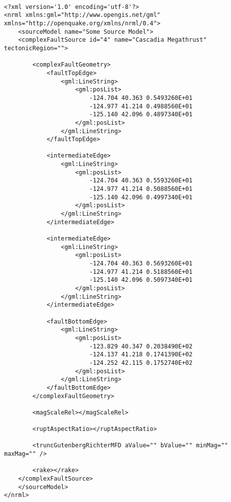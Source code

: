 \begin{Verbatim}[frame=single, commandchars=\\\{\}, fontsize=\scriptsize, samepage=true]

<?xml version='1.0' encoding='utf-8'?>
<nrml xmlns:gml="http://www.opengis.net/gml" xmlns="http://openquake.org/xmlns/nrml/0.4">
    <sourceModel name="Some Source Model">
    <complexFaultSource id="4" name="Cascadia Megathrust" tectonicRegion="">

        <complexFaultGeometry>
            <faultTopEdge>
                <gml:LineString>
                    <gml:posList>
                        -124.704 40.363 0.5493260E+01
                        -124.977 41.214 0.4988560E+01
                        -125.140 42.096 0.4897340E+01
                    </gml:posList>
                </gml:LineString>
            </faultTopEdge>

            <intermediateEdge>
                <gml:LineString>
                    <gml:posList>
                        -124.704 40.363 0.5593260E+01
                        -124.977 41.214 0.5088560E+01
                        -125.140 42.096 0.4997340E+01
                    </gml:posList>
                </gml:LineString>
            </intermediateEdge>

            <intermediateEdge>
                <gml:LineString>
                    <gml:posList>
                        -124.704 40.363 0.5693260E+01
                        -124.977 41.214 0.5188560E+01
                        -125.140 42.096 0.5097340E+01
                    </gml:posList>
                </gml:LineString>
            </intermediateEdge>

            <faultBottomEdge>
                <gml:LineString>
                    <gml:posList>
                        -123.829 40.347 0.2038490E+02
                        -124.137 41.218 0.1741390E+02
                        -124.252 42.115 0.1752740E+02
                    </gml:posList>
                </gml:LineString>
            </faultBottomEdge>
        </complexFaultGeometry>

        <magScaleRel></magScaleRel>
        
        <ruptAspectRatio></ruptAspectRatio>

        <truncGutenbergRichterMFD aValue="" bValue="" minMag="" maxMag="" />

        <rake></rake>
    </complexFaultSource>
    </sourceModel>
</nrml>

\end{Verbatim}

